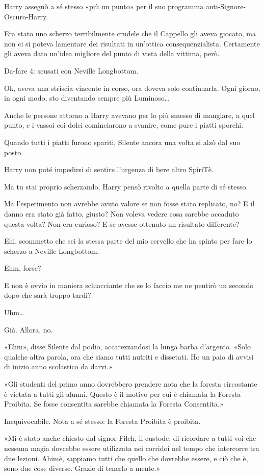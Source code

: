 Harry assegnò a sé stesso «più un punto» per il suo programma anti-Signore-Oscuro-Harry.

Era stato uno scherzo terribilmente crudele che il Cappello gli aveva giocato, ma non ci si poteva lamentare dei risultati in un’ottica consequenzialista. Certamente gli aveva dato un’idea migliore del punto di vista della vittima, però.

Da-fare 4: scusati con Neville Longbottom.

Ok, aveva una striscia vincente in corso, ora doveva solo continuarla. Ogni giorno, in ogni modo, sto diventando sempre più Luminoso…

Anche le persone attorno a Harry avevano per lo più smesso di mangiare, a quel punto, e i vassoi coi dolci cominciarono a svanire, come pure i piatti sporchi.

Quando tutti i piatti furono spariti, Silente ancora una volta si alzò dal suo posto.

Harry non poté impedirsi di sentire l’urgenza di bere altro SpiriTè.

Ma tu stai proprio scherzando, Harry pensò rivolto a quella parte di sé stesso.

Ma l’esperimento non avrebbe avuto valore se non fosse stato replicato, no? E il danno era stato già fatto, giusto? Non voleva vedere cosa sarebbe accaduto questa volta? Non era curioso? E se avesse ottenuto un risultato differente?

Ehi, scommetto che sei la stessa parte del mio cervello che ha spinto per fare lo scherzo a Neville Longbottom.

Ehm, forse?

E non è ovvio in maniera schiacciante che se lo faccio me ne pentirò un secondo dopo che sarà troppo tardi?

Uhm…

Già. Allora, no.

«Ehm», disse Silente dal podio, accarezzandosi la lunga barba d’argento. «Solo qualche altra parola, ora che siamo tutti nutriti e dissetati. Ho un paio di avvisi di inizio anno scolastico da darvi.»

«Gli studenti del primo anno dovrebbero prendere nota che la foresta circostante è vietata a tutti gli alunni. Questo è il motivo per cui è chiamata la Foresta Proibita. Se fosse consentita sarebbe chiamata la Foresta Consentita.»

Inequivocabile. Nota a sé stesso: la Foresta Proibita è proibita.

«Mi è stato anche chiesto dal signor Filch, il custode, di ricordare a tutti voi che nessuna magia dovrebbe essere utilizzata nei corridoi nel tempo che intercorre tra due lezioni. Ahimè, sappiamo tutti che quello che dovrebbe essere, e ciò che è, sono due cose diverse. Grazie di tenerlo a mente.»

